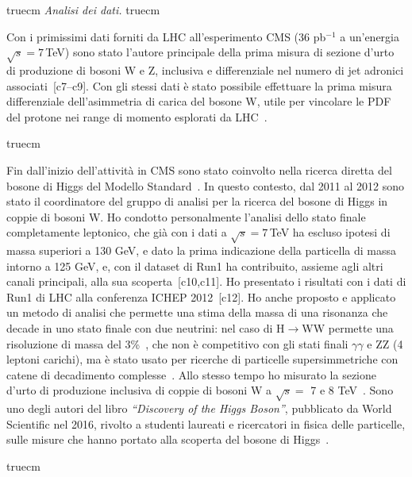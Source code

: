 \documentclass[11pt,twoside,a4paper]{article}
\begin{document}
 truecm
\textit{Analisi dei dati.}
 truecm

Con i primissimi dati forniti da LHC all'esperimento CMS (36 pb$^{-1}$
a un'energia $\sqrt{s}=7$\,TeV) sono stato l'autore principale della
prima misura di sezione d'urto di produzione di bosoni W e Z,
inclusiva e differenziale nel numero di jet adronici
associati~\cite{Chatrchyan:2011ne,Marco:2009dvd,Khachatryan:2010xn,CMS:2011aa}[c7--c9].
Con gli stessi dati \`e stato possibile effettuare la prima misura
differenziale dell'asimmetria di carica del bosone W, utile per
vincolare le PDF del protone nei range di momento esplorati da
LHC~\cite{Chatrchyan:2011jz}.

 truecm

Fin dall'inizio dell'attivit\`a in CMS sono stato coinvolto nella
ricerca diretta del bosone di Higgs del Modello
Standard~\cite{Chatrchyan:2011tz,Chatrchyan:2012tx,Chatrchyan:2012ty}. In
questo contesto, dal 2011 al 2012 sono stato il coordinatore del
gruppo di analisi per la ricerca del bosone di Higgs in coppie di
bosoni W. Ho condotto personalmente l'analisi dello stato finale
completamente leptonico, che gi\`a con i dati a $\sqrt{s}=7$\,TeV ha
escluso ipotesi di massa superiori a 130 GeV, e dato la prima
indicazione della particella di massa intorno a 125 GeV, e, con il
dataset di Run1 ha contribuito, assieme agli altri canali principali,
alla sua
scoperta~\cite{Chatrchyan:2012ufa,Chatrchyan:2013lba,Chatrchyan:2012ufa}[c10,c11].
Ho presentato i risultati con i dati di Run1 di LHC alla conferenza
ICHEP 2012~[c12]. Ho anche proposto e applicato un metodo di analisi
che permette una stima della massa di una risonanza che decade in uno
stato finale con due neutrini: nel caso di H$\to$WW permette una
risoluzione di massa del 3\%~\cite{Chatrchyan:2013iaa}, che non \`e
competitivo con gli stati finali $\gamma\gamma$ e ZZ (4 leptoni
carichi), ma \`e stato usato per ricerche di particelle
supersimmetriche con catene di decadimento
complesse~\cite{Khachatryan:2016epu}. Allo stesso tempo ho misurato la
sezione d'urto di produzione inclusiva di coppie di bosoni W a
$\sqrt{s}=$ 7 e 8 TeV~\cite{Chatrchyan:2013yaa}. Sono uno degli autori
del libro \textit{``Discovery of the Higgs Boson''}, pubblicato da
World Scientific nel 2016, rivolto a studenti laureati e ricercatori
in fisica delle particelle, sulle misure che hanno portato alla
scoperta del bosone di Higgs~\cite{Nisati:2017cst}.

 truecm
\end{document}
